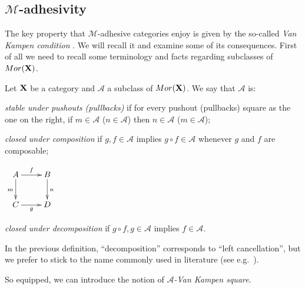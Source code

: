 \documentclass[a4paper,UKenglish,cleveref,pdftex, thm-restate,numberwithinsect]{lipics}
\newcommand{\mor}{\mathsf{Mor}}
\def\X{\textbf {\textup{X}}}
\begin{document}
\subsection{$\mathcal{M}$-adhesivity}
The key property that $\mathcal{M}$-adhesive categories enjoy is given by  the so-called \emph{Van Kampen condition} \cite{brown1997van,johnstone2007quasitoposes,lack2005adhesive}. We will recall it and examine some of its consequences. First of all we need to recall some terminology and facts regarding subclasses of $\mor(\X)$.

\begin{definition}
	Let $\X$ be a category and $\mathcal{A}$ a  subclass of $\mor(\X)$. We say that  $\mathcal{A}$ is:
	\begin{itemize}
		\parbox{11cm}{\item 
		\emph{stable under pushouts (pullbacks)} if for every pushout (pullbacks) square as the one on the right, 	if $m \in \mathcal{A}$ ($n\in \mathcal{A}$) then $n \in \mathcal{A}$ ($m \in \mathcal{A}$);
			\item \emph{closed under composition} if $g, f\in \mathcal{A}$ implies $g\circ f\in \mathcal{A}$ whenever $g$ and $f$ are composable; }\hfill
		\parbox{2cm}{$\xymatrix{A\ar[r]^f  \ar[d]_{m}& B \ar[d]^n \\ C \ar[r]_g & D}$}
		\parbox{11cm}{}\hfill 
	
	
	
		\item \emph{closed under decomposition} if $g\circ f, g\in \mathcal{A}$ implies $f\in \mathcal{A}$.
	\end{itemize}
\end{definition}

\begin{remark}In the previous definition, ``decomposition'' corresponds to ``left cancellation'', but we prefer to stick to the name commonly used in literature (see e.g.~\cite{habel2012mathcal}).
\end{remark}
So equipped, we can introduce the notion of \emph{$\mathcal{A}$-Van Kampen square}.
\end{document}
